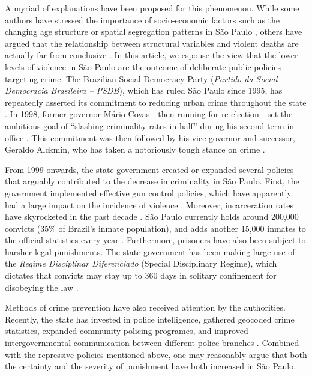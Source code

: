\documentclass[a4paper,11pt]{article}
\begin{document}
A myriad of explanations have been proposed for this phenomenon. While some authors have stressed the importance of socio-economic factors such as the changing age structure \citep{mello2010} or spatial segregation patterns in S\~{a}o Paulo \citep{hughes2004}, others have argued that the relationship between structural variables and violent deaths are actually far from conclusive \citep{mendonca2003}. In this article, we espouse the view that the lower levels of violence in S\~{a}o Paulo are the outcome of deliberate public policies targeting crime. The Brazilian Social Democracy Party (\textit{Partido da Social Democracia Brasileira -- PSDB}), which has ruled S\~{a}o Paulo since 1995, has repeatedly asserted its commitment to reducing urban crime throughout the state \citep{bueno2014}. In 1998, former governor M\'{a}rio Covas---then running for re-election---set the ambitious goal of ``slashing criminality rates in half'' during his second term in office \citep{santos2008}. This commitment was then followed by his vice-governor and successor, Geraldo Alckmin, who has taken a notoriously tough stance on crime \citep{feltran2012}. 

From 1999 onwards, the state government created or expanded several policies that arguably contributed to the decrease in criminality in S\~{a}o Paulo. First, the government implemented effective gun control policies, which have apparently had a large impact on the incidence of violence \citep{goertzel2009, nadanovsky2009}. Moreover, incarceration rates have skyrocketed in the past decade \citep{salla2007}. S\~{a}o Paulo currently holds around 200,000 convicts (35\% of Brazil's inmate population), and adds another 15,000 inmates to the official statistics every year \citep{brasildefato2013}. Furthermore, prisoners have also been subject to harsher legal punishments. The state government has been making large use of the \textit{Regime Disciplinar Diferenciado} (Special Disciplinary Regime), which dictates that convicts may stay up to 360 days in solitary confinement for disobeying the law \citep{carvalho2005}. 

Methods of crime prevention have also received attention by the authorities. Recently, the state has invested in police intelligence, gathered geocoded crime statistics, expanded community policing programes, and improved intergovernmental communication between different police branches \citep{goertzel2009}. Combined with the repressive policies mentioned above, one may reasonably argue that both the certainty and the severity of punishment \citep{becker1974} have both increased in S\~{a}o Paulo.
\end{document}
